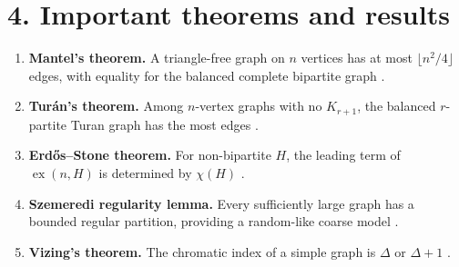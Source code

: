 \section*{4. Important theorems and results}
\begin{enumerate}[leftmargin=*,itemsep=0.35em]
\item \textbf{Mantel's theorem.} A triangle-free graph on $n$ vertices has at most $\lfloor n^2/4\rfloor$ edges, with equality for the balanced complete bipartite graph \cite{extremal_graph_theory_ref3}.

\item \textbf{Turán's theorem.} Among $n$-vertex graphs with no $K_{r+1}$, the balanced $r$-partite Turan graph has the most edges \cite{extremal_graph_theory_ref3}.

\item \textbf{Erdős--Stone theorem.} For non-bipartite $H$, the leading term of $\operatorname{ex}(n,H)$ is determined by $\chi(H)$ \cite{extremal_graph_theory_ref1}.

\item \textbf{Szemeredi regularity lemma.} Every sufficiently large graph has a bounded regular partition, providing a random-like coarse model \cite{extremal_graph_theory_ref4}.

\item \textbf{Vizing's theorem.} The chromatic index of a simple graph is $\Delta$ or $\Delta+1$ \cite{extremal_graph_theory_ref2}.
\end{enumerate}

\theoryapplications
{}
